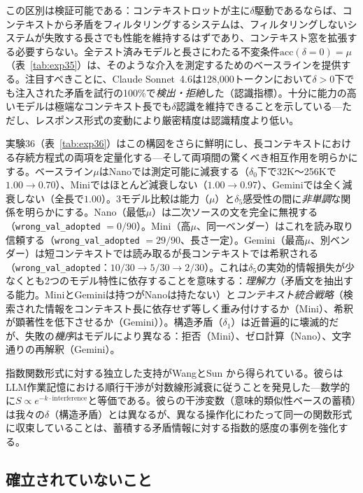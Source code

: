\documentclass[11pt,a4paper]{article}
\begin{document}
\noindent この区別は検証可能である：コンテキストロットが主に$\delta$駆動であるならば、コンテキストから矛盾をフィルタリングするシステムは、フィルタリングしないシステムが失敗する長さでも性能を維持するはずであり、コンテキスト窓を拡張する必要すらない。全テスト済みモデルと長さにわたる不変条件$\text{acc}(\delta = 0) = \mu$（表~\ref{tab:exp35}）は、そのような介入を測定するためのベースラインを提供する。注目すべきことに、Claude Sonnet~4.6は128{,}000トークンにおいて$\delta > 0$下でも注入された矛盾を試行の100\%で\emph{検出・拒絶}した（認識指標）。十分に能力の高いモデルは極端なコンテキスト長でも$\delta$認識を維持できることを示している---ただし、レスポンス形式の変動により厳密精度は認識精度より低い。

実験36（表~\ref{tab:exp36}）はこの構図をさらに鮮明にし、長コンテキストにおける存続方程式の両項を定量化する---そして両項間の驚くべき相互作用を明らかにする。ベースライン$\mu$はNanoでは測定可能に減衰する（$\delta_0$下で32K〜256Kで$1.00 \to 0.70$）、Miniではほとんど減衰しない（$1.00 \to 0.97$）、Geminiでは全く減衰しない（全長で$1.00$）。3モデル比較は能力（$\mu$）と$\delta_5$感受性の間に\emph{非単調}な関係を明らかにする。Nano（最低$\mu$）は二次ソースの文を完全に無視する（\texttt{wrong\_val\_adopted} $= 0/90$）。Mini（高$\mu$、同一ベンダー）はこれを読み取り信頼する（\texttt{wrong\_val\_adopted} $= 29/90$、長さ一定）。Gemini（最高$\mu$、別ベンダー）は短コンテキストでは読み取るが長コンテキストでは希釈される（\texttt{wrong\_val\_adopted}：$10/30 \to 5/30 \to 2/30$）。これは$\delta_5$の実効的情報損失が少なくとも2つのモデル特性に依存することを意味する：\emph{理解力}（矛盾文を抽出する能力。MiniとGeminiは持つがNanoは持たない）と\emph{コンテキスト統合戦略}（検索された情報をコンテキスト長に依存せず等しく重み付けするか（Mini）、希釈が顕著性を低下させるか（Gemini））。構造矛盾（$\delta_1$）は近普遍的に壊滅的だが、失敗の\emph{機序}はモデルにより異なる：拒否（Mini）、ゼロ計算（Nano）、文字通りの再解釈（Gemini）。

指数関数形式に対する独立した支持がWangとSun \cite{wang2025interference}から得られている。彼らはLLM作業記憶における順行干渉が対数線形減衰に従うことを発見した---数学的に$S \propto e^{-k \cdot \text{interference}}$と等価である。彼らの干渉変数（意味的類似性ベースの蓄積）は我々の$\delta$（構造矛盾）とは異なるが、異なる操作化にわたって同一の関数形式に収束していることは、蓄積する矛盾情報に対する指数的感度の事例を強化する。

\subsection{確立されていないこと}
\end{document}
